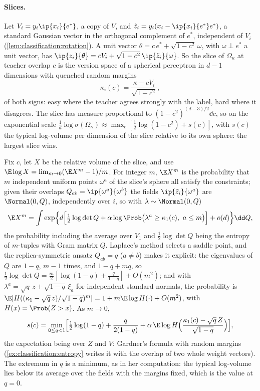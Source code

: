 \begin{refsection}
\paragraph{Slices.} Let $V_i=y_i\ip{x_i}{e^*}$, a copy of $V$, and $\tilde z_i=y_i(x_i-\ip{x_i}{e^*}e^*)$, a standard Gaussian vector in the orthogonal complement of $e^*$, independent of $V_i$ (\cref{lem:classification:rotation}). A unit vector $\theta=c\,e^*+\sqrt{1-c^2}\,\omega$, with $\omega\perp e^*$ a unit vector, has $\ip{z_i}{\theta}=cV_i+\sqrt{1-c^2}\,\ip{\tilde z_i}{\omega}$. So the slice of $\Omega_\kappa$ at teacher overlap $c$ is the version space of a spherical perceptron in $d-1$ dimensions with quenched random margins
\begin{equation}\label{eq:classification:sitemargins}
\kappa_i(c)=\frac{\kappa-cV_i}{\sqrt{1-c^2}},
\end{equation}
of both signs: easy where the teacher agrees strongly with the label, hard where it disagrees. The slice has measure proportional to $(1-c^2)^{(d-3)/2}\dd c$, so on the exponential scale $\frac1d\log\sigma(\Omega_\kappa)\approx\max_c[\frac12\log(1-c^2)+s(c)]$, with $s(c)$ the typical log-volume per dimension of the slice relative to its own sphere: the largest slice wins.

\begin{heuristic}
Fix $c$, let $X$ be the relative volume of the slice, and use $\E\log X=\lim_{m\to0}(\E X^m-1)/m$. For integer $m$, $\E X^m$ is the probability that $m$ independent uniform points $\omega^a$ of the slice's sphere all satisfy the constraints; given their overlaps $Q_{ab}=\ip{\omega^a}{\omega^b}$ the fields $\ip{\tilde z_i}{\omega^a}$ are $\Normal(0,Q)$, independently over $i$, so with $\lambda\sim\Normal(0,Q)$
\[
\E X^m=\int\exp\Bigl\{d\Bigl[\tfrac12\log\det Q+\alpha\log\Prob\bigl(\lambda^a\ge\kappa_1(c),\ a\le m\bigr)\Bigr]+o(d)\Bigr\}\dd Q,
\]
the probability including the average over $V_1$ and $\frac12\log\det Q$ being the entropy of $m$-tuples with Gram matrix $Q$. Laplace's method selects a saddle point, and the replica-symmetric ansatz $Q_{ab}=q$ ($a\ne b$) makes it explicit: the eigenvalues of $Q$ are $1-q$, $m-1$ times, and $1-q+mq$, so $\frac12\log\det Q=\frac m2[\log(1-q)+\frac q{1-q}]+O(m^2)$; and with $\lambda^a=\sqrt q\,z+\sqrt{1-q}\,\xi_a$ for independent standard normals, the probability is $\E[H((\kappa_1-\sqrt q\,z)/\sqrt{1-q})^m]=1+m\E\log H(\cdot)+O(m^2)$, with $H(x)=\Prob(Z>x)$. As $m\to0$,
\begin{equation}\label{eq:classification:slicers}
s(c)=\min_{0\le q<1}\Bigl[\tfrac12\log(1-q)+\frac q{2(1-q)}+\alpha\,\E\log H\Bigl(\frac{\kappa_1(c)-\sqrt q\,Z}{\sqrt{1-q}}\Bigr)\Bigr],
\end{equation}
the expectation being over $Z$ and $V$: Gardner's formula with random margins (\cref{ex:classification:entropy} writes it with the overlap of two whole weight vectors). The extremum in $q$ is a minimum, as in her computation: the typical log-volume lies below its average over the fields with the margins fixed, which is the value at $q=0$.
\end{heuristic}


\end{refsection}
